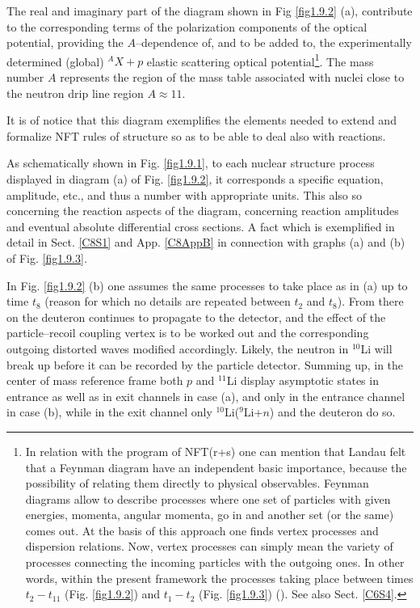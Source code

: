 The real and imaginary part of the diagram shown in Fig \ref{fig1.9.2} (a), contribute to the corresponding terms of the polarization components of the optical potential, providing the $A$--dependence of, and to be added to, the experimentally determined (global) $^AX+p$ elastic scattering optical potential\footnote{In relation with the program of NFT(r+s) one can mention that Landau felt that a Feynman diagram have an independent basic importance, because the possibility of relating them directly to physical observables. Feynman diagrams allow to describe processes where one set of particles with given energies, momenta, angular momenta, go in and another set (or the same) comes out. At the basis of this approach one finds vertex processes and dispersion relations. Now, vertex processes can simply mean the variety of processes connecting the incoming particles with the outgoing ones. In other words, within the present framework the processes taking place between times $t_2-t_{11}$ (Fig. \ref{fig1.9.2}) and $t_1-t_2$ (Fig. \ref{fig1.9.3}) (\cite{Landau:59,terHaar:69}). See also Sect. \ref{C6S4}.}. The mass number $A$ represents the region of the mass table associated with nuclei close to the neutron  drip line region $A\approx11$.


  It is of
notice that this diagram exemplifies  the elements needed to extend and formalize NFT rules of
structure so as to be able to deal also with reactions.

As schematically shown in Fig. \ref{fig1.9.1}, to each nuclear structure process displayed in diagram (a) of Fig. \ref{fig1.9.2}, it corresponds a specific equation, amplitude, etc., and thus a number with appropriate units. This also so concerning the reaction aspects of the diagram, concerning reaction amplitudes and eventual absolute differential cross sections. A fact which is exemplified in detail in Sect. \ref{C8S1} and App. \ref{C8AppB} in connection with graphs (a) and (b) of Fig. \ref{fig1.9.3}.


 In Fig. \ref{fig1.9.2} (b) one assumes the same processes to take place  as in (a) up to time $t_8$ (reason for which no details
are repeated between $t_2$ and $t_8$). From there on the deuteron continues to propagate to
the detector, and the effect of the particle--recoil coupling vertex is to be worked out and the corresponding outgoing distorted waves modified accordingly. Likely, the neutron in $^{10}$Li will break up
before it can be recorded by the particle detector. Summing up, in the center of mass reference frame both $p$ and $^{11}$Li
display asymptotic states in entrance as well as in exit channels in case (a), and only
in the entrance channel in case (b), while in the exit channel only $^{10}$Li($^9$Li+$n$) and the
deuteron do so. 

